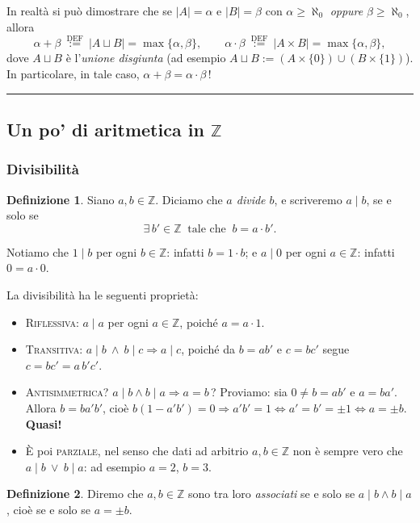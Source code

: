 \documentclass[11pt,a4paper]{article}
\newcommand{\Z}{\mathbb{Z}}
\theoremstyle{definition}
\newtheorem{definizione}{Definizione}[section]
\theoremstyle{plain}
\theoremstyle{remark}
\begin{document}
In realtà si può dimostrare che se $|A|=\alpha$ e $|B|=\beta$ con $\alpha\ge\aleph_0$ \emph{oppure} $\beta\ge\aleph_0$, allora
\[
\alpha+\beta\ \overset{\text{DEF}}{:=}\ |A\sqcup B|=\max\{\alpha,\beta\},\qquad
\alpha\cdot\beta\ \overset{\text{DEF}}{:=}\ |A\times B|=\max\{\alpha,\beta\},
\]
dove $A\sqcup B$ è l'\emph{unione disgiunta} (ad esempio $A\sqcup B:=(A\times\{0\})\cup(B\times\{1\})$). In particolare, in tale caso, $\alpha+\beta=\alpha\cdot\beta$\,!



\bigskip\hrule\bigskip

\subsection{Un po' di aritmetica in $\Z$}

\subsubsection*{Divisibilità}

\begin{definizione}
Siano $a,b\in\Z$. Diciamo che \emph{$a$ divide $b$}, e scriveremo $a\mid b$, se e solo se
\[
\exists\,b'\in\Z\ \text{ tale che }\ b=a\cdot b'.
\]
\end{definizione}

Notiamo che $1\mid b$ per ogni $b\in\Z$: infatti $b=1\cdot b$; e $a\mid0$ per ogni $a\in\Z$: infatti $0=a\cdot0$.

La divisibilità ha le seguenti proprietà:
\begin{itemize}
\item \textsc{Riflessiva}: $a\mid a$ per ogni $a\in\Z$, poiché $a=a\cdot1$.
\item \textsc{Transitiva}: $a\mid b\ \wedge\ b\mid c\Rightarrow a\mid c$, poiché da $b=ab'$ e $c=bc'$ segue $c=bc'=a\,b'c'$.
\item \textsc{Antisimmetrica}? $a\mid b\wedge b\mid a\Rightarrow a=b$\,? Proviamo: sia $0\ne b=ab'$ e $a=ba'$. Allora $b=ba'b'$, cioè $b(1-a'b')=0\Rightarrow a'b'=1\iff a'=b'=\pm1\iff a=\pm b$. \textbf{Quasi!}
\item È poi \textsc{parziale}, nel senso che dati ad arbitrio $a,b\in\Z$ non è sempre vero che $a\mid b\ \vee\ b\mid a$: ad esempio $a=2$, $b=3$.
\end{itemize}

\begin{definizione}
Diremo che $a,b\in\Z$ sono tra loro \emph{associati} se e solo se $a\mid b\wedge b\mid a$, cioè se e solo se $a=\pm b$.
\end{definizione}
\end{document}
